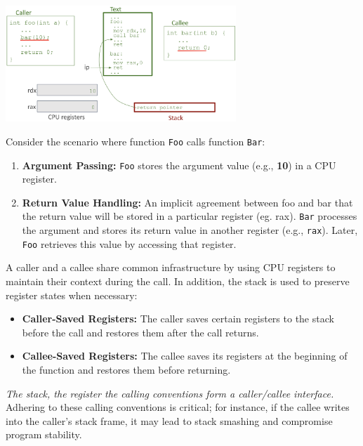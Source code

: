 \begin{center}
    \includegraphics[width=0.65\textwidth]{chapters/L4/images/foo-bar.png}
\end{center}
\vspace{10px}
\begin{example}
Consider the scenario where function \texttt{Foo} calls function \texttt{Bar}:
\begin{enumerate}
    \item \textbf{Argument Passing:} \texttt{Foo} stores the argument value (e.g., \textbf{10}) in a CPU register. 
    \item \textbf{Return Value Handling:} An implicit agreement between foo and bar that the return value will be stored in a particular register (eg. rax). \texttt{Bar} processes the argument and stores its return value in another register (e.g., \texttt{rax}). Later, \texttt{Foo} retrieves this value by accessing that register.
\end{enumerate}
\end{example}

A caller and a callee share common infrastructure by using CPU registers to maintain their context during the call. In addition, the stack is used to preserve register states when necessary:
\begin{itemize}
    \item \textbf{Caller-Saved Registers:} The caller saves certain registers to the stack before the call and restores them after the call returns.
    \item \textbf{Callee-Saved Registers:} The callee saves its registers at the beginning of the function and restores them before returning.
\end{itemize}
\textit{The stack, the register the calling conventions form a caller/callee interface.}\\
Adhering to these calling conventions is critical; for instance, if the callee writes into the caller's stack frame, it may lead to stack smashing and compromise program stability.



